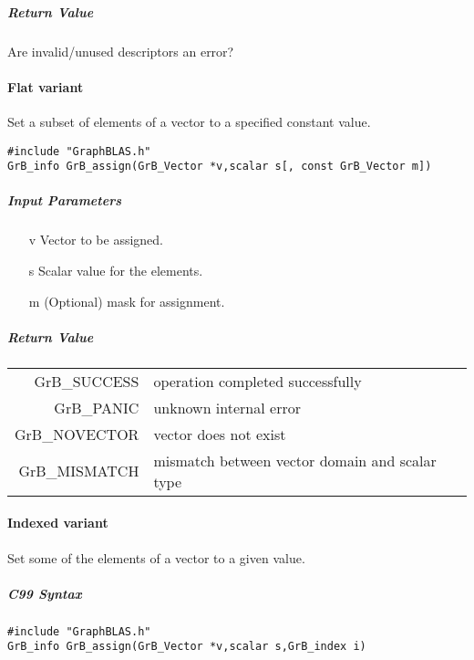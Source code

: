 \subparagraph{Return Value}

Are invalid/unused descriptors an error?

\paragraph{Flat variant}

Set a subset of elements of a vector to a specified constant value.

\begin{verbatim}
#include "GraphBLAS.h"
GrB_info GrB_assign(GrB_Vector *v,scalar s[, const GrB_Vector m])
\end{verbatim}

\subparagraph{Input Parameters}

\begin{itemize}
	\item[{\sf v}] Vector to be assigned.
	\item[{\sf s}] Scalar value for the elements.
	\item[{\sf m}] (Optional) mask for assignment.  
\end{itemize}

\subparagraph{Return Value}

\begin{tabular}{rl}
{\sf GrB\_SUCCESS}	& operation completed successfully \\
{\sf GrB\_PANIC}	& unknown internal error \\
{\sf GrB\_NOVECTOR}	& vector does not exist \\
{\sf GrB\_MISMATCH}	& mismatch between vector domain and scalar type \\
\end{tabular}

\paragraph{Indexed variant}

Set some of the elements of a vector to a given value.

\subparagraph{C99 Syntax}

\begin{verbatim}
#include "GraphBLAS.h"
GrB_info GrB_assign(GrB_Vector *v,scalar s,GrB_index i)
\end{verbatim}

